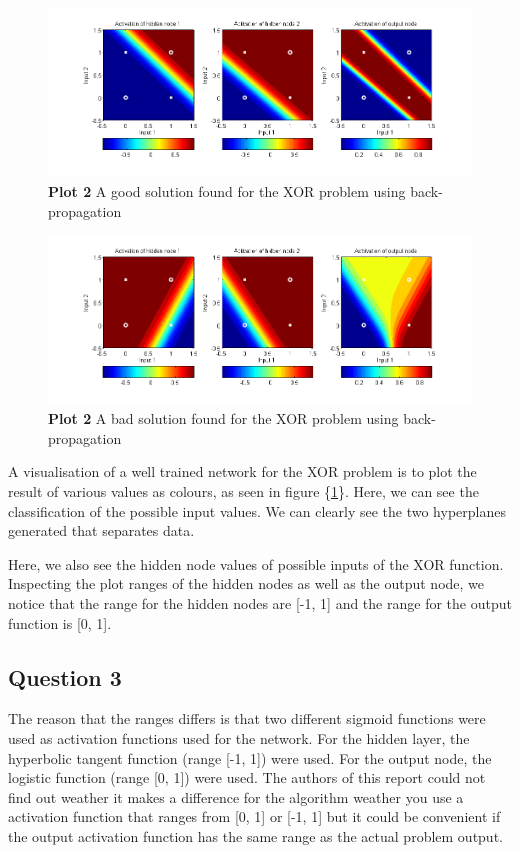 \documentclass[a4paper]{article}
\begin{document}
\begin{figure}[H] %
	\includegraphics[scale=0.55]{good_bprop_xor_plot.png}
	\caption{\label{fig:good_bprop_xor_plot}\textbf{Plot 2} A good solution found for the XOR problem using back-propagation}
\end{figure}
\begin{figure}[H] %
	\includegraphics[scale=0.55]{bad_bprop_xor_plot.png}
	\caption{\label{fig:bad_bprop_xor_plot}\textbf{Plot 2} A bad solution found for the XOR problem using back-propagation}
\end{figure}
A visualisation of a well trained network for the XOR problem  
is to plot the result of various values 
as colours, as seen in figure \{\ref{fig:good_bprop_xor_plot}\}. 
Here, we can see the classification of the possible input values. We can 
clearly see the two hyperplanes generated that separates data. 

Here, we also see the hidden node values of possible inputs of the XOR function.
Inspecting the plot ranges of the hidden nodes as well as the output node, we notice that
the range for the hidden nodes are [-1, 1] and the range for the output function is [0, 1].
\subsection*{Question 3}
The reason that the ranges differs is that two 
different sigmoid functions were used as activation functions used for the network. 
For the hidden layer, the hyperbolic tangent function (range [-1, 1]) were used. 
For the output node, the logistic function (range [0, 1]) were used. The authors of 
this report could not find out weather it makes a difference for the algorithm weather 
you use a activation function that ranges from [0, 1] or [-1, 1] but it could be 
convenient if the output activation function has the same range as the actual problem 
output. 
\end{document}
